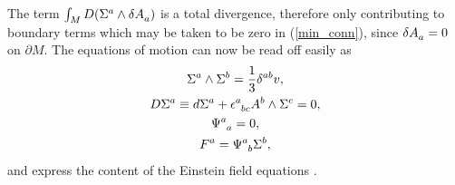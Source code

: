 \documentclass[a4paper,12pt, onecolumn, notitlepage]{article}
\theoremstyle{definition}
\theoremstyle{remark}
\newcommand{\e}{\epsilon}
\begin{document}
The term $\int_{M} D(\Sigma\indices{^a}\wedge\delta A\indices{_a})$ is a total divergence, therefore only contributing to boundary terms which may be taken to be zero in (\ref{min_conn}), since $\delta A\indices{_a}=0$ on $\partial M.$ The equations of motion can now be read off easily as
\begin{subequations}
	\begin{gather}
\label{prop_vol_form}
\Sigma^{a}\wedge\Sigma^{b} = \frac{1}{3}\delta^{ab}v,\\
\label{cov_derivative}
D\Sigma^{a} \equiv d\Sigma^{a} + \e\indices{^a_b_c}A^{b}\wedge\Sigma^{c} = 0,\\
\label{traceless}
\Psi\indices{^a_a} = 0,\\
\label{weyl}
F^{a} = \Psi\indices{^a_b}\Sigma^{b},
	\end{gather}
\end{subequations}
and express the content of the Einstein field equations \cite{capovilla_1989, capovilla_1993}.\\
\end{document}
